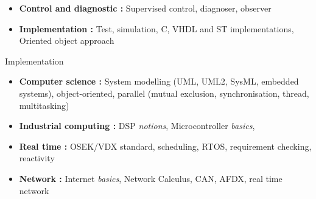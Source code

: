 \documentclass[11pt,a4paper,sans]{moderncv}        %
\newcommand{\myitem}{\textbullet}
\begin{document}
\begin{samepage}
{{\begin{itemize}[label=\myitem]
		\item \textbf{Control and diagnostic : }%
		{\small Supervised control, diagnoser, observer}
		\item \textbf{Implementation : }%
		{\small Test, simulation, C, VHDL and ST implementations, Oriented object approach}
		\end{itemize}}}%
%
{Implementation}%
{{%
		\begin{itemize}[label=\myitem]%
\item \textbf{Computer science : }%
{\small System modelling (UML, UML2, SysML, embedded systems), object-oriented, parallel (mutual exclusion, synchronisation, thread, multitasking)}%
\item \textbf{Industrial computing : }%
{\small DSP \textit{notions}, Microcontroller \textit{basics}, } %
\item \textbf{Real time : }%
{\small OSEK/VDX standard, scheduling, RTOS, requirement checking, reactivity}%
\item \textbf{Network : }%
{\small Internet \textit{basics}, Network Calculus, CAN, AFDX, real time network}%
	\end{itemize}%
}}%
	

\end{samepage}
\end{document}
